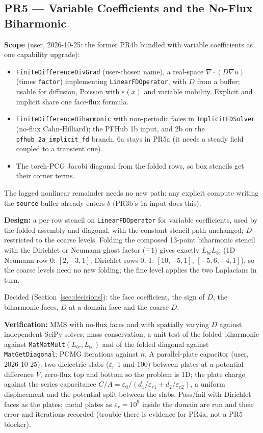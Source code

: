 \documentclass[11pt]{article}
\newcommand{\pr}[2]{\subsection{PR#1 --- #2}}
\begin{document}
\pr{5}{Variable Coefficients and the No-Flux Biharmonic}
\textbf{Scope} (user, 2026-10-25: the former PR4b bundled with variable
coefficients as one capability upgrade):
\begin{itemize}[leftmargin=*]
\item \texttt{FiniteDifferenceDivGrad} (user-chosen name), a real-space
$\nabla\cdot(D\nabla u)$ (times \texttt{factor}) implementing \texttt{LinearFDOperator}, with $D$
from a buffer; usable for diffusion, Poisson with $\varepsilon(x)$ and variable
mobility. Explicit and implicit share one face-flux formula.
\item \texttt{FiniteDifferenceBiharmonic} with non-periodic faces in
\texttt{ImplicitFDSolver} (no-flux Cahn-Hilliard); the PFHub 1b input, and 2b
on the \texttt{pfhub\_2a\_implicit\_fd} branch. 6a stays in PR5a (it needs a
steady field coupled to a transient one).
\item The torch-PCG Jacobi diagonal from the folded rows, so box stencils get
their corner terms.
\end{itemize}
The lagged nonlinear remainder needs no new path: any explicit compute
writing the \texttt{source} buffer already enters $b$ (PR3b's 1a input does
this).

\textbf{Design:} a per-row stencil on \texttt{LinearFDOperator} for
variable coefficients, used by the folded assembly and diagonal, with the
constant-stencil path unchanged; $D$ restricted to the coarse levels. Folding
the composed 13-point biharmonic stencil with the Dirichlet or Neumann ghost
factor ($\mp1$) gives exactly $L_{bc}L_{bc}$ (1D Neumann row 0:
$[2,-3,1]$; Dirichlet rows 0, 1: $[10,-5,1]$, $[-5,6,-4,1]$), so the coarse
levels need no new folding; the fine level applies the two Laplacians in turn.

Decided (Section~\ref{sec:decisions}): the face coefficient, the sign of $D$,
the biharmonic faces, $D$ at a domain face and the coarse $D$.

\textbf{Verification:} MMS with no-flux faces and with spatially varying
$D$ against independent SciPy solves; mass conservation; a unit test of the
folded biharmonic against \texttt{MatMatMult}$(L_{bc}, L_{bc})$ and of the
folded diagonal against \texttt{MatGetDiagonal}; PCMG iterations against
$n$. A parallel-plate capacitor (user, 2026-10-25): two dielectric slabs
($\varepsilon_r$ 1 and 100) between plates at a potential difference $V$,
zero-flux top and bottom so the problem is 1D; the plate charge against the
series capacitance $C/A = \varepsilon_0 / (d_1/\varepsilon_{r1} +
d_2/\varepsilon_{r2})$, a uniform displacement and the potential split
between the slabs. Pass/fail with Dirichlet faces as the plates; metal plates
as $\varepsilon_r = 10^9$ inside the domain are run and their error and
iterations recorded (trouble there is evidence for PR4a, not a PR5 blocker).
\end{document}
